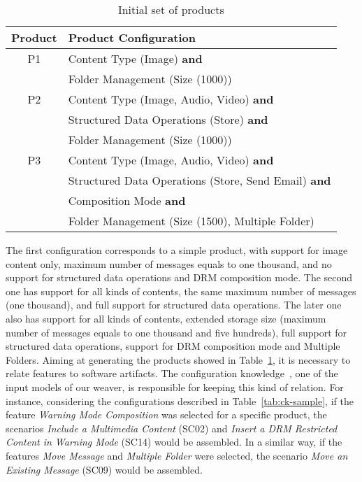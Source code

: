 \documentclass{acm_proc_article-sp}
\begin{document}
\begin{table}[hb]
\centering
\caption{Initial set of products}
\label{tab:initial-products}
\begin{small}
\begin{tabular}{|c|l|} \hline
Product & Product Configuration \\ \hline
P1  & Content Type (Image) {\bf and} \\ 
      & Folder Management (Size (1000))\\ \hline
P2  & Content Type (Image, Audio, Video) {\bf and} \\ 
      & Structured Data Operations (Store) {\bf and} \\ 
      & Folder Management (Size (1000))  \\ \hline
P3  & Content Type (Image, Audio, Video) {\bf and} \\ 
      & Structured Data Operations (Store, Send Email) {\bf and}\\
      & Composition Mode {\bf and} \\
      & Folder Management (Size (1500), Multiple Folder)  \\ \hline 
\end{tabular}
\end{small}
\end{table}

The first configuration corresponds to a simple product, with support for image content only, maximum number of messages equals to one thousand, and no support for structured data operations and DRM composition mode. The second one has support for all kinds of contents, the same maximum number of messages (one thousand), and full support for structured data operations. The later one also has support for all kinds of contents, extended storage size (maximum number of messages equals to one thousand and five hundreds), full support for structured data operations, support for DRM composition mode and Multiple Folders. 
Aiming at generating the products showed in Table~\ref{tab:initial-products}, it is necessary to relate features to software artifacts. The configuration knowledge~\cite{czarnecki-book, phol-spl-book}, one of the input models of our weaver, is responsible for keeping this kind of relation. For instance, considering the configurations described in Table~\ref{tab:ck-sample}, if the feature \emph{Warning Mode Composition} was selected for a specific product, the scenarios \emph{Include a Multimedia Content} (SC02) and \emph{Insert a DRM Restricted Content in Warning Mode} (SC14) would be assembled. 
In a similar way, if the features \emph{Move Message} and \emph{Multiple Folder} were selected, the scenario \emph{Move an Existing Message} (SC09) would be assembled. 
\end{document}
